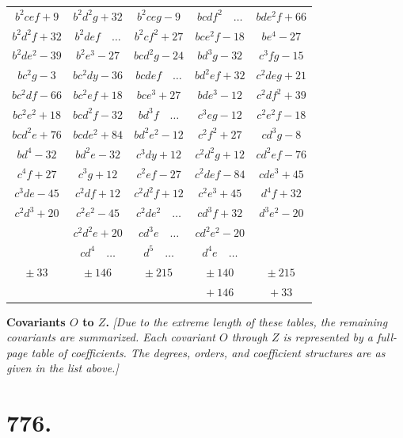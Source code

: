 \documentclass[11pt,a4paper]{article}
\theoremstyle{cayley}
\begin{document}
\begin{center}
\begin{tabular}{|c|c|c|c|c|}
$b^{2}cef+9$ & $b^{2}d^{2}g+32$ & $b^{2}ceg-9$ & $bcdf^{2}\quad\dots$ & $bde^{2}f+66$ \\
$b^{2}d^{2}f+32$ & $b^{2}def\quad\dots$ & $b^{2}cf^{2}+27$ & $bce^{2}f-18$ & $be^{4}-27$ \\
$b^{2}de^{2}-39$ & $b^{2}e^{3}-27$ & $bcd^{2}g-24$ & $bd^{3}g-32$ & $c^{3}fg-15$ \\
$bc^{2}g-3$ & $bc^{2}dy-36$ & $bcdef\quad\dots$ & $bd^{2}ef+32$ & $c^{2}deg+21$ \\
$bc^{2}df-66$ & $bc^{2}ef+18$ & $bce^{3}+27$ & $bde^{3}-12$ & $c^{2}df^{2}+39$ \\
$bc^{2}e^{2}+18$ & $bcd^{2}f-32$ & $bd^{3}f\quad\dots$ & $c^{3}eg-12$ & $c^{2}e^{2}f-18$ \\
$bcd^{2}e+76$ & $bcde^{2}+84$ & $bd^{2}e^{2}-12$ & $c^{2}f^{2}+27$ & $cd^{3}g-8$ \\
$bd^{4}-32$ & $bd^{2}e-32$ & $c^{3}dy+12$ & $c^{2}d^{2}g+12$ & $cd^{2}ef-76$ \\
$c^{4}f+27$ & $c^{3}g+12$ & $c^{2}ef-27$ & $c^{2}def-84$ & $cde^{3}+45$ \\
$c^{3}de-45$ & $c^{2}df+12$ & $c^{2}d^{2}f+12$ & $c^{2}e^{3}+45$ & $d^{4}f+32$ \\
$c^{2}d^{3}+20$ & $c^{2}e^{2}-45$ & $c^{2}de^{2}\quad\dots$ & $cd^{3}f+32$ & $d^{3}e^{2}-20$ \\
 & $c^{2}d^{2}e+20$ & $cd^{3}e\quad\dots$ & $cd^{2}e^{2}-20$ &  \\
 & $cd^{4}\quad\dots$ & $d^{5}\quad\dots$ & $d^{4}e\quad\dots$ &  \\
\hline
$\pm\ 33$ & $\pm\ 146$ & $\pm\ 215$ & $\pm\ 140$ & $\pm\ 215$ \\
 &  &  & $+\ 146$ & $+\ 33$ \\
\hline
\end{tabular}
\end{center}

\textbf{Covariants $O$ to $Z$.} \textit{[Due to the extreme length of these tables, the remaining covariants are summarized. Each covariant $O$ through $Z$ is represented by a full-page table of coefficients. The degrees, orders, and coefficient structures are as given in the list above.]}

\newpage

\newpage

\section*{776.}
\end{document}
